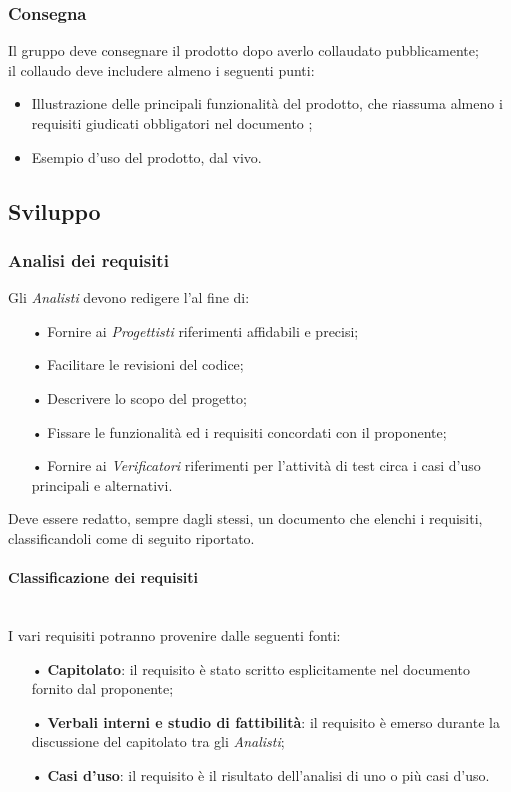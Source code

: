 \subsubsection{Consegna}
Il gruppo deve consegnare il prodotto dopo averlo collaudato pubblicamente;\\il collaudo deve includere almeno i seguenti punti:
\begin{itemize}
\item Illustrazione delle principali funzionalità del prodotto, che riassuma almeno i requisiti giudicati obbligatori nel documento \AdR ;
\item Esempio d’uso del prodotto, dal vivo.
\end{itemize}

\subsection{Sviluppo}
\subsubsection{Analisi dei requisiti}
Gli \textit{Analisti} devono redigere l'\AdR  al fine di:
\begin{itemize}
    \item[•] Fornire ai \textit{Progettisti} riferimenti affidabili e precisi;
    \item[•] Facilitare le revisioni del codice;
    \item[•] Descrivere lo scopo del progetto;
    \item[•] Fissare le funzionalità ed i {requisiti} concordati con il proponente;
    \item[•] Fornire ai \textit{Verificatori} riferimenti per l'attività di test circa i casi d'uso principali e alternativi.
\end{itemize}

Deve essere redatto, sempre dagli stessi, un documento che elenchi i requisiti, classificandoli come di seguito riportato.

\paragraph{Classificazione dei requisiti}\mbox{}\\
I vari requisiti potranno provenire dalle seguenti fonti:
\begin{itemize}
    \item[•] \textbf{Capitolato}: il requisito è stato scritto esplicitamente nel documento fornito dal proponente;
    \item[•] \textbf{Verbali interni e studio di fattibilità}: il requisito è emerso durante la discussione del capitolato tra gli \textit{Analisti};
    \item[•] \textbf{Casi d'uso}: il requisito è il risultato dell'analisi di uno o più casi d'uso.
\end{itemize}

